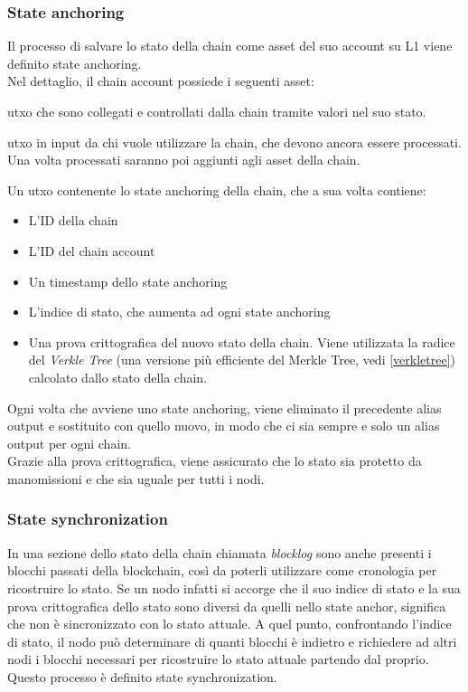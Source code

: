 \documentclass[12pt,a4paper,openright,twoside]{report}
\begin{document}
\subsubsection{State anchoring}
Il processo di salvare lo stato della chain come asset del suo account su L1 viene definito state anchoring.\\
Nel dettaglio, il chain account possiede i seguenti asset:
\begin{description}[font=$\bullet$\:\:,leftmargin=\parindent,labelindent=\parindent]
  \item[Asset della chain] \acrshort{utxo} che sono collegati e controllati dalla chain tramite valori nel suo stato.
  \item[Richieste per la chain] \acrshort{utxo} in input da chi vuole utilizzare la chain, che devono ancora essere processati. Una volta processati saranno poi aggiunti agli asset della chain.
  \item[Alias output] Un \acrshort{utxo} contenente lo state anchoring della chain, che a sua volta contiene:
  \begin{itemize}[label=$\circ$]
      \item L'ID della chain
      \item L'ID del chain account
      \item Un timestamp dello state anchoring
      \item L'indice di stato, che aumenta ad ogni state anchoring
      \item Una prova crittografica del nuovo stato della chain. Viene utilizzata la radice del \textit{Verkle Tree} (una versione più efficiente del Merkle Tree, vedi \ref{verkletree}) calcolato dallo stato della chain.
  \end{itemize}
\end{description}
Ogni volta che avviene uno state anchoring, viene eliminato il precedente alias output e sostituito con quello nuovo, in modo che ci sia sempre e solo un alias output per ogni chain.\\
Grazie alla prova crittografica, viene assicurato che lo stato sia protetto da manomissioni e che sia uguale per tutti i nodi.
\subsubsection{State synchronization}
\label{state_sync}
In una sezione dello stato della chain chiamata \textit{blocklog} sono anche presenti i blocchi passati della blockchain, così da poterli utilizzare come cronologia per ricostruire lo stato. Se un nodo infatti si accorge che il suo indice di stato e la sua prova crittografica dello stato sono diversi da quelli nello state anchor, significa che non è sincronizzato con lo stato attuale. A quel punto, confrontando l'indice di stato, il nodo può determinare di quanti blocchi è indietro e richiedere ad altri nodi i blocchi necessari per ricostruire lo stato attuale partendo dal proprio. Questo processo è definito state synchronization.
\end{document}
